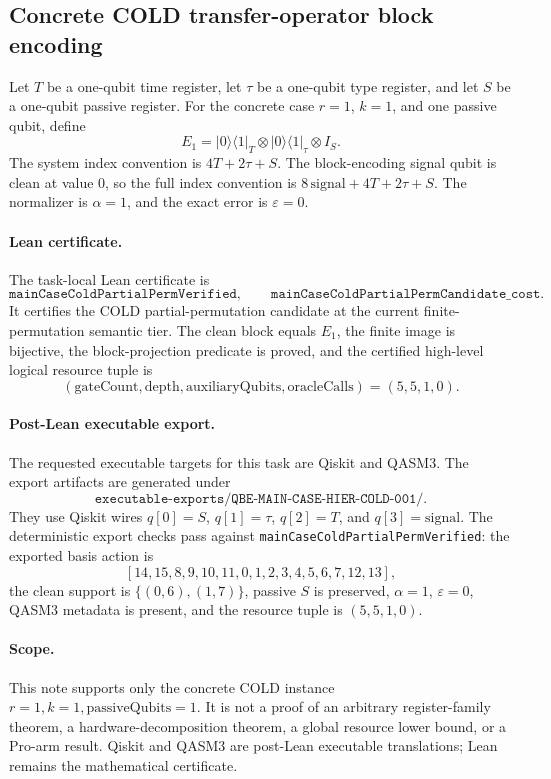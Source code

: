 
\subsection{Concrete COLD transfer-operator block encoding}

Let \(T\) be a one-qubit time register, let \(\tau\) be a one-qubit type
register, and let \(S\) be a one-qubit passive register.  For the concrete
case \(r=1\), \(k=1\), and one passive qubit, define
\[
  E_1 =
  |0\rangle\langle 1|_T
  \otimes
  |0\rangle\langle 1|_\tau
  \otimes I_S .
\]
The system index convention is \(4T+2\tau+S\).  The block-encoding signal
qubit is clean at value \(0\), so the full index convention is
\(8\,\mathrm{signal}+4T+2\tau+S\).  The normalizer is \(\alpha=1\), and the
exact error is \(\varepsilon=0\).

\paragraph{Lean certificate.}
The task-local Lean certificate is
\[
  \texttt{mainCaseColdPartialPermVerified},
  \qquad
  \texttt{mainCaseColdPartialPermCandidate\_cost}.
\]
It certifies the COLD partial-permutation candidate at the current
finite-permutation semantic tier.  The clean block equals \(E_1\), the finite
image is bijective, the block-projection predicate is proved, and the certified
high-level logical resource tuple is
\[
  (\mathrm{gateCount},\mathrm{depth},\mathrm{auxiliaryQubits},
  \mathrm{oracleCalls})=(5,5,1,0).
\]

\paragraph{Post-Lean executable export.}
The requested executable targets for this task are Qiskit and QASM3.  The
export artifacts are generated under
\[
  \texttt{executable-exports/QBE-MAIN-CASE-HIER-COLD-001/}.
\]
They use Qiskit wires \(q[0]=S\), \(q[1]=\tau\), \(q[2]=T\), and
\(q[3]=\mathrm{signal}\).  The deterministic export checks pass against
\texttt{mainCaseColdPartialPermVerified}: the exported basis action is
\[
  [14,15,8,9,10,11,0,1,2,3,4,5,6,7,12,13],
\]
the clean support is \(\{(0,6),(1,7)\}\), passive \(S\) is preserved,
\(\alpha=1\), \(\varepsilon=0\), QASM3 metadata is present, and the resource
tuple is \((5,5,1,0)\).

\paragraph{Scope.}
This note supports only the concrete COLD instance
\(r=1,k=1,\mathrm{passiveQubits}=1\).  It is not a proof of an arbitrary
register-family theorem, a hardware-decomposition theorem, a global resource
lower bound, or a Pro-arm result.  Qiskit and QASM3 are post-Lean executable
translations; Lean remains the mathematical certificate.
